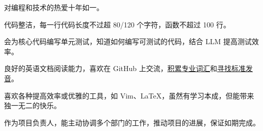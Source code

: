 

\begin{cventries}

  \cventry
    {} {} {} {}
    {
      \begin{cvitems}
        \item {对编程和技术的热爱十年如一。}
        \item {代码整洁，每一行代码长度不过超 80/120 个字符，函数不超过 100 行。}
        \item {会为核⼼代码编写单元测试，知道如何编写可测试的代码，结合 LLM 提高测试效率。}
        \item {良好的英语文档阅读能力，喜欢在 GitHub 上交流，\href{https://www.kugarocks.com/zh-cn/linux/appendix/term-1/}{\uline{积累专业词汇}}和\href{https://www.kugarocks.com/zh-cn/linux/say-my-name/}{\uline{寻找标准发音}}。}
        \item {喜欢各种提高效率或优雅的工具，如 Vim、LaTeX，虽然有学习本成，但能带来独一无二的快乐。}
        \item {作为项⽬负责⼈，能主动协调多个部门的工作，推动项⽬的进展，保证如期完成。}
      \end{cvitems}
    }

\end{cventries}
